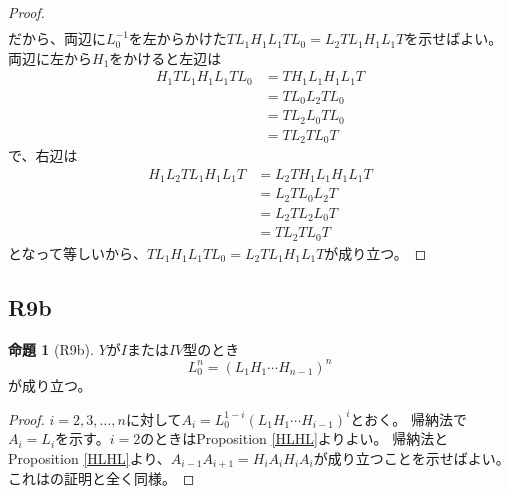 \documentclass[uplatex, a4paper, dvipdfmx]{jsarticle}
\theoremstyle{definition}
\newtheorem{proposition}[theorem]{命題}
\begin{document}
\begin{proof}
\begin{align}
    \end{align}
    だから、両辺に$L_0^{-1}$を左からかけた$TL_1H_1L_1TL_0=L_2 TL_1 H_1L_1T$を示せばよい。
    両辺に左から$H_1$をかけると左辺は
    \begin{align}
        H_1TL_1H_1L_1TL_0 & = TH_1L_1H_1L_1T \\
                          & = TL_0L_2TL_0    \\
                          & = TL_2L_0TL_0    \\
                          & = TL_2TL_0T
    \end{align}
    で、右辺は
    \begin{align}
        H_1L_2TL_1H_1L_1T & = L_2TH_1L_1H_1L_1T \\
                          & = L_2TL_0L_2T       \\
                          & = L_2TL_2L_0T       \\
                          & = TL_2TL_0T
    \end{align}
    となって等しいから、$TL_1H_1L_1TL_0=L_2 TL_1 H_1L_1T$が成り立つ。
\end{proof}
\subsection{R9b}
\begin{proposition}[R9b]
    $Y$が$I$または$IV$型のとき
    \begin{equation}
        L_0^n = (L_1H_1\cdots H_{n-1})^n
    \end{equation}
    が成り立つ。
\end{proposition}
\begin{proof}
    $i = 2, 3, \dots, n$に対して$A_i = L_0^{1-i}(L_1H_1\cdots H_{i-1})^i$とおく。
    帰納法で$A_i = L_i$を示す。$i=2$のときはProposition \ref{HLHL}よりよい。
    帰納法とProposition \ref{HLHL}より、$A_{i-1}A_{i+1} = H_iA_iH_iA_i$が成り立つことを示せばよい。
    これは\cite[Theorem 3.8]{MR1805936}の証明と全く同様。
\end{proof}
\end{document}
